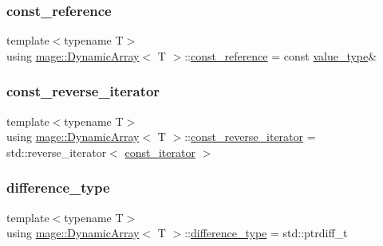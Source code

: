 \mbox{\label{classmage_1_1_dynamic_array_ad2c044077223c0463e317649d4513dbc}} 
\subsubsection{\texorpdfstring{const\+\_\+reference}{const\_reference}}
{\footnotesize\ttfamily template$<$typename T$>$ \\
using \mbox{\hyperlink{classmage_1_1_dynamic_array}{mage\+::\+Dynamic\+Array}}$<$ T $>$\+::\mbox{\hyperlink{classmage_1_1_dynamic_array_ad2c044077223c0463e317649d4513dbc}{const\+\_\+reference}} =  const \mbox{\hyperlink{classmage_1_1_dynamic_array_a1f26711f844168c39991df0d5a340178}{value\+\_\+type}}\&}

\mbox{\label{classmage_1_1_dynamic_array_afbcc530c2cd68cc3b0474a4b1a5c6a15}} 
\subsubsection{\texorpdfstring{const\+\_\+reverse\+\_\+iterator}{const\_reverse\_iterator}}
{\footnotesize\ttfamily template$<$typename T$>$ \\
using \mbox{\hyperlink{classmage_1_1_dynamic_array}{mage\+::\+Dynamic\+Array}}$<$ T $>$\+::\mbox{\hyperlink{classmage_1_1_dynamic_array_afbcc530c2cd68cc3b0474a4b1a5c6a15}{const\+\_\+reverse\+\_\+iterator}} =  std\+::reverse\+\_\+iterator$<$ \mbox{\hyperlink{classmage_1_1_dynamic_array_ad27aa1273eb102bbd596a13a00159001}{const\+\_\+iterator}} $>$}

\mbox{\label{classmage_1_1_dynamic_array_a23347e93a3cf12c24608d95ed698ce20}} 
\subsubsection{\texorpdfstring{difference\+\_\+type}{difference\_type}}
{\footnotesize\ttfamily template$<$typename T$>$ \\
using \mbox{\hyperlink{classmage_1_1_dynamic_array}{mage\+::\+Dynamic\+Array}}$<$ T $>$\+::\mbox{\hyperlink{classmage_1_1_dynamic_array_a23347e93a3cf12c24608d95ed698ce20}{difference\+\_\+type}} =  std\+::ptrdiff\+\_\+t}

